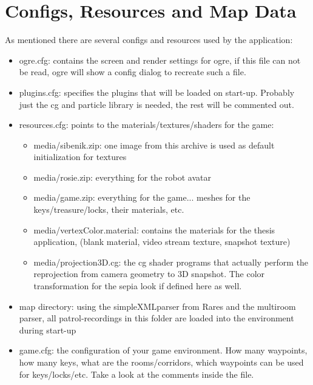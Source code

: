 \documentclass[a4paper, 12pt]{article}
\begin{document}
\section{Configs, Resources and Map Data}
As mentioned there are several configs and resources used by the application:
\begin{itemize}
\item ogre.cfg: contains the screen and render settings for ogre, if this file can not be read, ogre will show a config dialog to recreate such a file.
\item plugins.cfg: specifies the plugins that will be loaded on start-up. Probably just the cg and particle library is needed, the rest will be commented out.
\item resources.cfg: points to the materials/textures/shaders for the game:
  \begin{itemize}
  \item media/sibenik.zip: one image from this archive is used as default initialization for textures
  \item media/rosie.zip: everything for the robot avatar
  \item media/game.zip: everything for the game... meshes for the keys/treasure/locks, their materials, etc.
  \item media/vertexColor.material: contains the materials for the thesis application, (blank material, video stream texture, snapshot texture)
  \item media/projection3D.cg: the cg shader programs that actually perform the reprojection from camera geometry to 3D snapshot. The color transformation for the sepia look if defined here as well.
  \end{itemize}
\item map directory: using the simpleXMLparser from Rares and the multiroom parser, all patrol-recordings in this folder are loaded into the environment during start-up
\item game.cfg: the configuration of your game environment. How many waypoints, how many keys, what are the rooms/corridors, which waypoints can be used for keys/locks/etc. Take a look at the comments inside the file.
\end{itemize}
\end{document}
